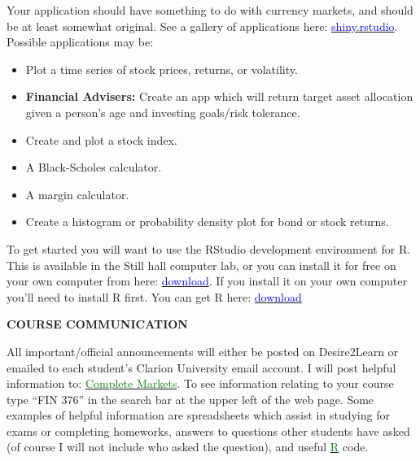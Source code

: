 \documentclass{article}
\begin{document}
Your application should have something to do with currency markets, and should be at least somewhat original.  See a gallery of applications here:  \href{http://shiny.rstudio.com/}{\textcolor{blue}{shiny.rstudio}}. Possible applications may be:
\begin{itemize}
\item Plot a time series of stock prices, returns, or volatility.
\item {\bf Financial Advisers:}  Create an app which will return target asset allocation given a person's age and investing goals/risk tolerance.
\item Create and plot a stock index.
\item A Black-Scholes calculator.
\item A margin calculator.
\item Create a histogram or probability density plot for bond or stock returns.
\end{itemize}
To get started you will want to use the RStudio development environment for R.  This is available in the Still hall computer lab, or you can install it for free on your own computer from here:  \href{https://www.rstudio.com/products/rstudio/download/}{\textcolor{blue}{download}}.  If you install it on your own computer you'll need to install R first.  You can get R here:  \href{https://cran.r-project.org/}{\textcolor{blue}{download}}
\vspace*{5pt}
\begin{center}
{\bf COURSE COMMUNICATION}
\end{center}
All important/official announcements will either be posted on Desire2Learn
or emailed to each student's Clarion University email account. I will post helpful information
to: \href{http://www.complete-markets.com}{\textcolor{green}{Complete Markets}}. To see information relating to your course type ``FIN 376'' in
the search bar at the upper left of the web page. Some examples of helpful information are
spreadsheets which assist in studying for exams or completing homeworks, answers to questions
other students have asked (of course I will not include who asked the question), and useful \href{http://www.r-project.org}{\textcolor{green}{R}} code. \\
\\
\\
\end{document}
